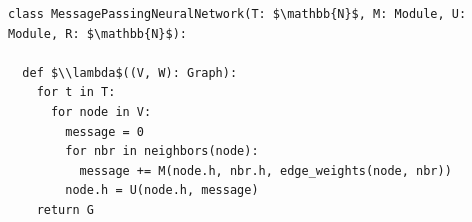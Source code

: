 \documentclass[border=10pt]{standalone}
\begin{document}
\begin{lstlisting}
class MessagePassingNeuralNetwork(T: $\mathbb{N}$, M: Module, U: Module, R: $\mathbb{N}$):

  def $\\lambda$((V, W): Graph):
    for t in T:
      for node in V:
        message = 0
        for nbr in neighbors(node):
          message += M(node.h, nbr.h, edge_weights(node, nbr))
        node.h = U(node.h, message)
    return G
\end{lstlisting}
\end{document}
